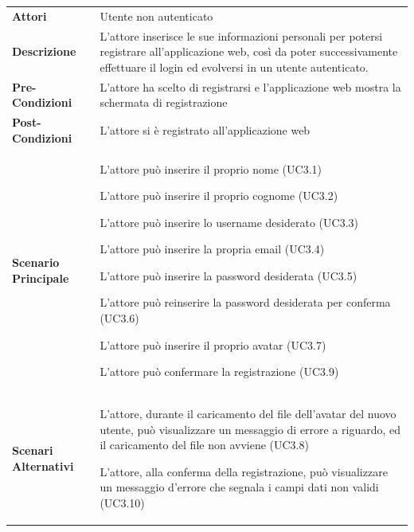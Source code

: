 \begin{longtable}{ l | p{11cm}}
	\hline
	\rowcolor{Gray}
	 \multicolumn{2}{c}{UC3 - Registrazione utente} \\
	 \hline
	\textbf{Attori} & Utente non autenticato \\
	\textbf{Descrizione} & L'attore inserisce le sue informazioni personali per potersi registrare all'applicazione web, così da poter successivamente effettuare il login ed evolversi in un utente autenticato. \\
	\textbf{Pre-Condizioni} & L'attore ha scelto di registrarsi e l'applicazione web mostra la schermata di registrazione \\
	\textbf{Post-Condizioni} & L'attore si è registrato all'applicazione web \\
	\textbf{Scenario Principale} & 
	\begin{enumerate*}[label=(\arabic*.),itemjoin={\newline}]
		\item L'attore può inserire il proprio nome (UC3.1)
		\item L'attore può inserire il proprio cognome (UC3.2)
		\item L'attore può inserire lo username desiderato (UC3.3)
		\item L'attore può inserire la propria email (UC3.4) 
		\item L'attore può inserire la password desiderata (UC3.5)
		\item L'attore può reinserire la password desiderata per conferma (UC3.6)
		\item L'attore può inserire il proprio avatar (UC3.7)
		\item L'attore può confermare la registrazione (UC3.9)
	\end{enumerate*}\\
	\textbf{Scenari Alternativi} & 
	\begin{enumerate*}[label=(\arabic*.),itemjoin={\newline}]
		\item L'attore, durante il caricamento del file dell'avatar del nuovo utente, può visualizzare un messaggio di errore a riguardo, ed il caricamento del file non avviene (UC3.8)
		\item L'attore, alla conferma della registrazione, può visualizzare un messaggio d'errore che segnala i campi dati non validi (UC3.10)
	\end{enumerate*}\\
\end{longtable}

